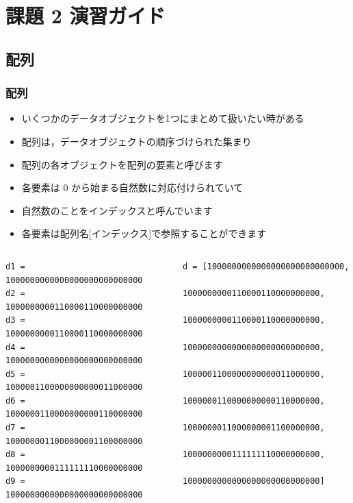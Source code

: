 \section{課題 2 演習ガイド}
%
%
\subsection{配列}
\begin{frame}[containsverbatim]
\frametitle{配列}
  \begin{itemize}
\item いくつかのデータオブジェクトを1つにまとめて扱いたい時がある
\item 配列は，データオブジェクトの順序づけられた集まり
\item 配列の各オブジェクトを配列の要素と呼びます
\item 各要素は 0 から始まる自然数に対応付けられていて
\item 自然数のことをインデックスと呼んでいます
\item 各要素は配列名[インデックス]で参照することができます
  \end{itemize}
\tiny
  \begin{columns}
    \begin{column}{0.45\textwidth}
      \begin{lstlisting}[caption={単純な変数},label=naive]
d1 =  1000000000000000000000000000
d2 =  1000000000110000110000000000
d3 =  1000000000110000110000000000
d4 =  1000000000000000000000000000
d5 =  1000001100000000000011000000
d6 =  1000000110000000000110000000
d7 =  1000000011000000001100000000
d8 =  1000000000111111110000000000
d9 =  1000000000000000000000000000
      \end{lstlisting}
    \end{column}
    \begin{column}{0.45\textwidth}
      \begin{lstlisting}[caption={配列},label=array]
 d = [1000000000000000000000000000,
      1000000000110000110000000000,
      1000000000110000110000000000,
      1000000000000000000000000000,
      1000001100000000000011000000,
      1000000110000000000110000000,
      1000000011000000001100000000,
      1000000000111111110000000000,
      1000000000000000000000000000]
      \end{lstlisting}
    \end{column}
  \end{columns}
\end{frame}
